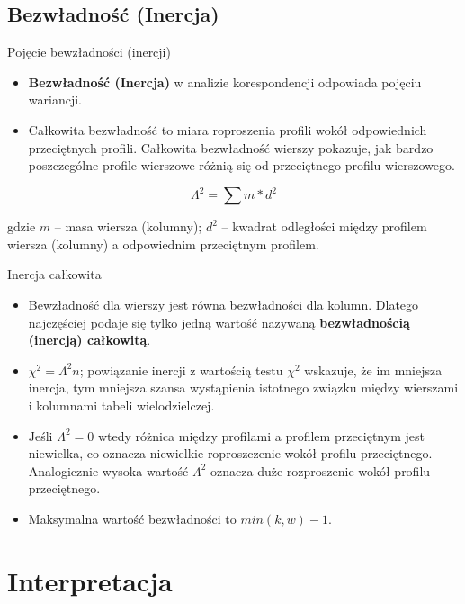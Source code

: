 \documentclass{beamer}
\begin{document}
\subsection{Bezwładność (Inercja)}
\begin{frame}{Pojęcie bewzładności (inercji)}
  \begin{itemize}
  \item \textbf{Bezwładność (Inercja)} w analizie korespondencji odpowiada pojęciu wariancji.
  \item Całkowita bezwładność to miara roproszenia profili wokół odpowiednich przeciętnych profili. Całkowita bezwładność wierszy pokazuje, jak bardzo poszczególne profile wierszowe różnią się od przeciętnego profilu wierszowego.
  \end{itemize}
  $$\Lambda^2 = \sum m* d^2$$
  \begin{scriptsize}
    gdzie $m$ -- masa wiersza (kolumny); $d^2$ -- kwadrat odległości między profilem wiersza (kolumny) a odpowiednim przeciętnym profilem. 
  \end{scriptsize}
\end{frame}

\begin{frame}{Inercja całkowita}
  \begin{itemize}
  \item Bewzładność dla wierszy jest równa bezwładności dla kolumn. Dlatego najczęściej podaje się tylko jedną wartość nazywaną \textbf{bezwładnością (inercją) całkowitą}.
  \item $\chi^2 = \Lambda^2n$; powiązanie inercji z wartością testu $\chi^2$ wskazuje, że im mniejsza inercja, tym mniejsza szansa wystąpienia istotnego związku między wierszami i kolumnami tabeli wielodzielczej.
  \item Jeśli $\Lambda^2 = 0$ wtedy różnica między profilami a profilem przeciętnym jest niewielka, co oznacza niewielkie roproszczenie wokół profilu przeciętnego. Analogicznie wysoka wartość $\Lambda^2$ oznacza duże rozproszenie wokół profilu przeciętnego.
  \item Maksymalna wartość bezwładności to $min(k, w)-1$.
  \end{itemize}
\end{frame}

\section{Interpretacja}
\end{document}
